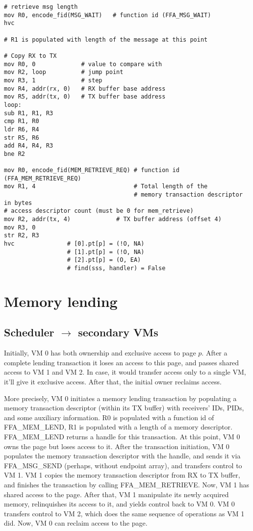 \documentclass{article}
\begin{document}
\begin{lstlisting}[caption={VM 2}]
# retrieve msg length
mov R0, encode_fid(MSG_WAIT)   # function id (FFA_MSG_WAIT)
hvc

# R1 is populated with length of the message at this point

# Copy RX to TX
mov R0, 0             # value to compare with
mov R2, loop          # jump point
mov R3, 1             # step
mov R4, addr(rx, 0)   # RX buffer base address
mov R5, addr(tx, 0)   # TX buffer base address
loop:
sub R1, R1, R3
cmp R1, R0
ldr R6, R4
str R5, R6
add R4, R4, R3
bne R2

mov R0, encode_fid(MEM_RETRIEVE_REQ) # function id (FFA_MEM_RETRIEVE_REQ)
mov R1, 4                            # Total length of the  
                                     # memory transaction descriptor in bytes
# access descriptor count (must be 0 for mem_retrieve)
mov R2, addr(tx, 4)             # TX buffer address (offset 4)
mov R3, 0
str R2, R3                                    
hvc               # [0].pt[p] = (!O, NA)            
                  # [1].pt[p] = (!O, NA)
                  # [2].pt[p] = (O, EA)
                  # find(sss, handler) = False
\end{lstlisting}

\section{Memory lending}

\subsection{Scheduler $\rightarrow$ secondary VMs}

Initially, VM 0 has both ownership and exclusive access to page $p$. After a complete lending transaction it loses an access to this page, and passes shared access to VM 1 and VM 2. In case, it would transfer access only to a single VM, it'll give it exclusive access. After that, the initial owner reclaims access.

More precisely, VM 0 initiates a memory lending transaction by populating a memory transaction descriptor (within its TX buffer) with receivers' IDs, PIDs, and some auxiliary information. R0 is populated with a function id of FFA\_MEM\_LEND, R1 is populated with a length of a memory descriptor. FFA\_MEM\_LEND returns a handle for this transaction. At this point, VM 0 owns the page but loses access to it. After the transaction initiation, VM 0 populates the memory transaction descriptor with the handle, and sends it via FFA\_MSG\_SEND (perhaps, without endpoint array), and transfers control to VM 1. VM 1 copies the memory transaction descriptor from RX to TX buffer, and finishes the transaction by calling FFA\_MEM\_RETRIEVE. Now, VM 1 has shared access to the page. After that, VM 1 manipulate its newly acquired memory, relinquishes its access to it, and yields control back to VM 0. VM 0 transfers control to VM 2, which does the same sequence of operations as VM 1 did. Now, VM 0 can reclaim access to the page.
\end{document}
